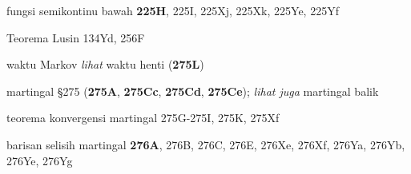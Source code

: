 fungsi semikontinu bawah {\bf 225H}, 225I, 225Xj, 225Xk,
225Ye, 225Yf











Teorema Lusin 134Yd, 256F
  





\indexmedskip
































































waktu Markov {\it lihat} waktu henti ({\bf 275L}) 













martingal \S275 ({\bf 275A}, {\bf 275Cc}, {\bf 275Cd}, {\bf
275Ce});
  {\it lihat juga} martingal balik


teorema konvergensi martingal 275G-275I, 
275K, 275Xf


barisan selisih martingal {\bf 276A}, 276B, 276C, 276E, 276Xe,
276Xf, 276Ya, 276Yb, 276Ye, 276Yg


